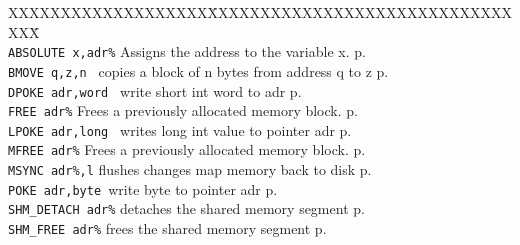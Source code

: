 \begin{tabbing}
XXXXXXXXXXXXXXXXXXX\=XXXXXXXXXXXXXXXXXXXXXXXXXXXXXXXX\=\kill\\

\verb|ABSOLUTE x,adr%| \> Assigns the address to the variable x.\> p.\pageref{ABSOLUTE}\\
{\tt BMOVE q,z,n	}\>	 copies a block of n bytes from address q to z\> p.\pageref{BMOVE}\\
{\tt DPOKE adr,word  	}\> write short int word to adr\> p.\pageref{DPOKE}\\
\verb|FREE adr%|          \> Frees a previously allocated memory block. \> p.\pageref{FREE}\\
{\tt LPOKE adr,long  	}\> writes long int value to pointer adr\> p.\pageref{LPOKE}\\
\verb|MFREE adr%|          \> Frees a previously allocated memory block. \> p.\pageref{MFREE}\\
\verb|MSYNC adr%,l| \>  flushes  changes map memory back to disk \> p.\pageref{MSYNC}\\
{\tt POKE adr,byte	}\>write byte to pointer adr\> p.\pageref{POKE}\\
\verb|SHM_DETACH adr%|   \> detaches the shared memory segment \> p.\pageref{SHMiDETACH}\\
\verb|SHM_FREE adr%|   \> frees the shared memory segment \> p.\pageref{SHMiFREE}\\
\end{tabbing}


